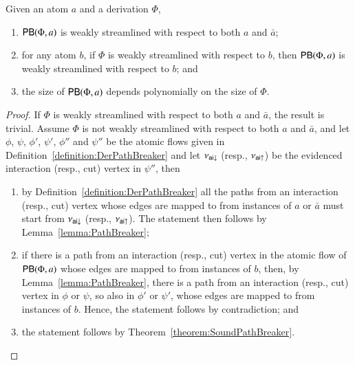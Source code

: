 
\begin{proposition}\label{proposition:PathBreaker}
Given an atom $a$ and a derivation $\Phi$,
\begin{enumerate}
\item $\mathsf{PB}(\Phi,a)$ is weakly streamlined with respect to both $a$ and $\bar a$;
\item for any atom $b$, if $\Phi$ is weakly streamlined with respect to $b$, then $\mathsf{PB}(\Phi,a)$ is weakly streamlined with respect to $b$; and
\item the size of\/ $\mathsf{PB}(\Phi,a)$ depends polynomially on the size of\/ $\Phi$.
\end{enumerate}
\end{proposition}

\begin{proof}
If $\Phi$ is weakly streamlined with respect to both $a$ and $\bar a$, the result is trivial. Assume $\Phi$ is not weakly streamlined with respect to both $a$ and $\bar a$, and let $\phi$, $\psi$, $\phi'$, $\psi'$, $\phi''$ and $\psi''$ be the atomic flows given in Definition~\ref{definition:DerPathBreaker} and let $\nu_{{\mathsf{ai}}{\downarrow}}$ (resp., $\nu_{{\mathsf{ai}}{\uparrow}}$) be the evidenced interaction (resp., cut) vertex in $\psi''$, then
\begin{enumerate}
\item by Definition~\ref{definition:DerPathBreaker} all the paths from an interaction (resp., cut) vertex whose edges are mapped to from instances of $a$ or $\bar a$ must start from $\nu_{{\mathsf{ai}}{\downarrow}}$ (resp., $\nu_{{\mathsf{ai}}{\uparrow}}$). The statement then follows by Lemma~\vref{lemma:PathBreaker};
\item if there is a path from an interaction (resp., cut) vertex in the atomic flow of $\mathsf{PB}(\Phi,a)$ whose edges are mapped to from instances of $b$, then, by Lemma~\ref{lemma:PathBreaker}, there is a path from an interaction (resp., cut) vertex in $\phi$ or $\psi$, so also in $\phi'$ or $\psi'$, whose edges are mapped to from instances of $b$. Hence, the statement follows by contradiction; and
\item the statement follows by Theorem~\vref{theorem:SoundPathBreaker}.
\end{enumerate}
\end{proof}

